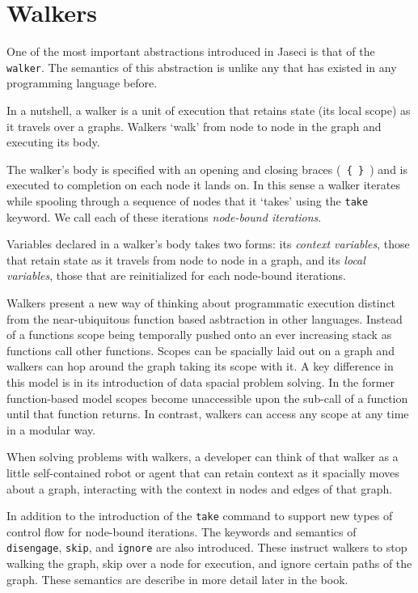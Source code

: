 \section{Walkers}
One of the most important abstractions introduced in Jaseci is that of the \texttt{walker}.
The semantics of this abstraction is unlike any that has existed in any programming language before.

In a nutshell, a walker is a unit of execution that retains state (its local scope) as it travels over a graphs.
Walkers `walk' from node to node in the graph and executing its body.

The walker's body is specified with an opening and closing braces (\texttt{ \{ \} }) and is executed to completion on each node it lands on.
In this sense a walker iterates while spooling through a sequence of nodes that it `takes' using the \lstinline{take} keyword.
We call each of these iterations \emph{node-bound iterations}.

Variables declared in a walker's body takes two forms: its \emph{context variables}, those that retain state as it travels from node to node in a graph, and its \emph{local variables}, those that are reinitialized for each node-bound iterations.

Walkers present a new way of thinking about programmatic execution distinct from the near-ubiquitous function based asbtraction in other languages.
Instead of a functions scope being temporally pushed onto an ever increasing stack as functions call other functions.
Scopes can be spacially laid out on a graph and walkers can hop around the graph taking its scope with it.
A key difference in this model is in its introduction of data spacial problem solving.
In the former function-based model scopes become unaccessible upon the sub-call of a function until that function returns.
In contrast, walkers can access any scope at any time in a modular way.

When solving problems with walkers, a developer can think of that walker as a little self-contained robot or agent that can retain context as it spacially moves about a graph, interacting with the context in nodes and edges of that graph.

In addition to the introduction of the \lstinline{take} command to support new types of control flow for node-bound iterations. The keywords and semantics of \lstinline{disengage}, \lstinline{skip}, and \lstinline{ignore} are also introduced. These instruct walkers to stop walking the graph, skip over a node for execution, and ignore certain paths of the graph.
These semantics are describe in more detail later in the book.

